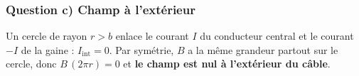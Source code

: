 \subsubsection*{Question c) Champ à l'extérieur}
Un cercle de rayon $r > b$ enlace le courant $I$ du conducteur central et le courant $-I$ de la gaine : $I_{\text{int}} = 0$. Par symétrie, $B$ a la même grandeur partout sur le cercle, donc $B\,(2\pi r) = 0$ et \textbf{le champ est nul à l'extérieur du câble}.
